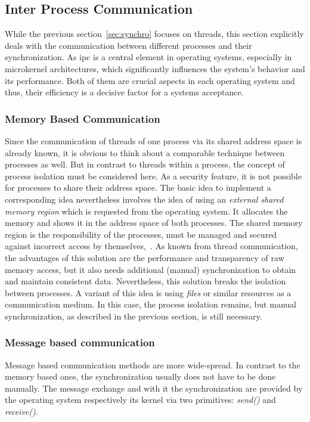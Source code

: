 \subsection{Inter Process Communication}\label{sec:ipc}
While the previous section~\ref{sec:synchro} focuses on threads, this section explicitly deals with the communication between different processes and their synchronization.
As \ac{ipc} is a central element in operating systems, especially in microkernel architectures, which significantly influences the system's behavior and its performance.
Both of them are crucial aspects in each operating system and thus, their efficiency is a decisive factor for a systems acceptance.


\subsubsection{Memory Based Communication}
Since the communication of threads of one process via its shared address space is already known, it is obvious to think about a comparable technique between processes as well.
But in contrast to threads within a process, the concept of process isolation must be considered here.
As a security feature, it is not possible for processes to share their address space. 
The basic idea to implement a corresponding idea nevertheless involves the idea of using an \textit{external shared memory region} which is requested from the operating system.
It allocates the memory and shows it in the address space of both processes\cite{brause2017betriebssysteme}.
The shared memory region is the responsibility of the processes, must be managed and secured against incorrect access by themselves\cite{brause2017betriebssysteme},~\cite{glatz2015betriebssysteme}.
As known from thread communication, the advantages of this solution are the performance and transparency of raw memory access, but it also needs additional (manual) synchronization to obtain and maintain consistent data\cite{glatz2015betriebssysteme}.
Nevertheless, this solution breaks the isolation between processes. 
A variant of this idea is using \textit{files} or similar resources as a communication medium.
In this case, the process isolation remains, but manual synchronization, as described in the previous section, is still necessary\cite{brause2017betriebssysteme}.


\subsubsection{Message based communication}
Message based communication methods are more wide-spread.
In contrast to the memory based ones, the synchronization usually does not have to be done manually.
The message exchange and with it the synchronization are provided by the operating system respectively its kernel via two primitives: \textit{send()} and \textit{receive()}\cite{tanenbaum-modern-operating-systems}.

